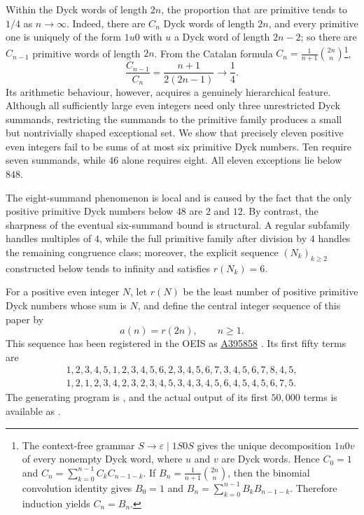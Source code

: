 \documentclass[12pt]{article}
\theoremstyle{plain}
\theoremstyle{definition}
\theoremstyle{plain}
\newcommand{\seqnum}[1]{\href{https://oeis.org/#1}{\rm \underline{#1}}}
\begin{document}
Within the Dyck words of length $2n$, the proportion that are primitive
tends to $1/4$ as $n\to\infty$.  Indeed, there are $C_n$ Dyck words of
length $2n$, and every primitive one is uniquely of the form $1u0$ with
$u$ a Dyck word of length $2n-2$; so there are $C_{n-1}$ primitive words
of length $2n$.  From the Catalan formula
$C_n=\frac1{n+1}\binom{2n}{n}$\footnote{The context-free grammar
$S\to\varepsilon\mid 1S0S$ gives the unique decomposition $1u0v$ of every
nonempty Dyck word, where $u$ and $v$ are Dyck words.  Hence $C_0=1$ and
$C_n=\sum_{k=0}^{n-1}C_kC_{n-1-k}$.  If
$B_n=\frac{1}{n+1}\binom{2n}{n}$, then the binomial convolution identity gives
$B_0=1$ and $B_n=\sum_{k=0}^{n-1}B_kB_{n-1-k}$.  Therefore induction yields
$C_n=B_n$.},
\[
 \frac{C_{n-1}}{C_n}=\frac{n+1}{2(2n-1)}\longrightarrow\frac14 .
\]
Its arithmetic behaviour, however, acquires a genuinely hierarchical
feature.  Although all sufficiently large even integers need only three
unrestricted Dyck summands, restricting the summands to the primitive family
produces a small but nontrivially shaped exceptional set.  We show that
precisely eleven positive even integers fail to be sums of at most six
primitive Dyck numbers.  Ten require seven summands, while $46$ alone
requires eight.  All eleven exceptions lie below $848$.

The eight-summand phenomenon is local and is caused by the fact that the only
positive primitive Dyck numbers below $48$ are $2$ and $12$.  By contrast,
the sharpness of the eventual six-summand bound is structural.  A regular
subfamily handles multiples of $4$, while the full primitive family after
division by $4$ handles the remaining congruence class; moreover, the
explicit sequence $(N_k)_{k\geq2}$ constructed below tends to infinity and
satisfies $r(N_k)=6$.

For a positive even integer $N$, let $r(N)$ be the least number of
positive primitive Dyck numbers whose sum is $N$, and define the central
integer sequence of this paper by
\[
        a(n)=r(2n),\qquad n\geq1.
\]
This sequence has been registered in the OEIS as
\seqnum{A395858} \cite{OEIS-A395858}.  Its first fifty terms are
\[
\begin{gathered}
1,2,3,4,5,1,2,3,4,5,6,2,3,4,5,6,7,3,4,5,6,7,8,4,5,\\
1,2,1,2,3,4,2,3,2,3,4,5,3,4,3,4,5,6,4,5,4,5,6,7,5.
\end{gathered}
\]
The generating program is
\href{https://github.com/growupkuriyama-hub/lean_cfg_project/blob/3525cfb/LeanCfgProject/PrimDyck/A395858.py}{},
and the actual output of its first $50{,}000$ terms is available as
\href{https://github.com/growupkuriyama-hub/lean_cfg_project/blob/3525cfb/LeanCfgProject/PrimDyck/b395858.txt}{}.
\end{document}
